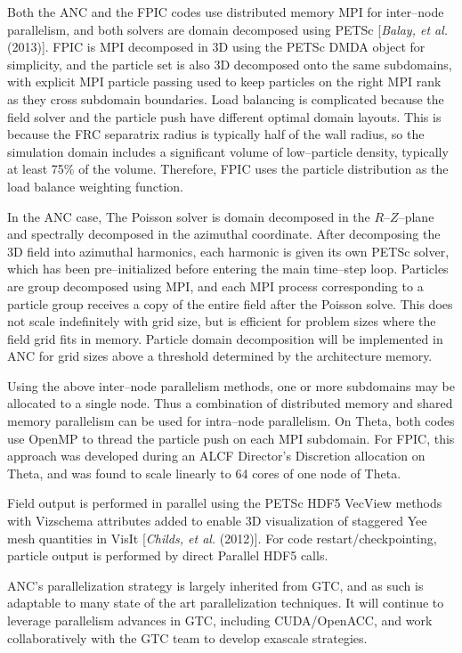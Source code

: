 \documentclass[a4paper,openany,12pt]{book}
\begin{document}
Both the ANC and the FPIC codes use distributed memory MPI for inter--node parallelism, and both solvers are domain decomposed using PETSc [\emph{Balay, et al.} (2013)]. FPIC is MPI decomposed in 3D using the PETSc DMDA object for simplicity, and the particle set is also 3D decomposed onto the same subdomains, with explicit MPI particle passing used to keep particles on the right MPI rank as they cross subdomain boundaries. Load balancing is complicated because the field solver and the particle push have different optimal domain layouts. This is because the FRC separatrix radius is typically half of the wall radius, so the simulation domain includes a significant volume of low--particle density, typically at least 75\% of the volume. Therefore, FPIC uses the particle distribution as the load balance weighting function.

In the ANC case, The Poisson solver is domain decomposed in the 
$R$--$Z$--plane and spectrally decomposed in the azimuthal coordinate. After decomposing the 3D field into azimuthal harmonics, each harmonic is given its own PETSc solver, which has been pre--initialized before entering the main time--step loop. Particles are group decomposed using MPI, and each MPI process corresponding to a particle group receives a copy of the entire field after the Poisson solve. This does not scale indefinitely with grid size, but is efficient for problem sizes where the field grid fits in memory. Particle domain decomposition will be implemented in ANC for grid sizes above a threshold determined by the architecture memory.

Using the above inter--node parallelism methods, one or more subdomains may be allocated to a single node. Thus a combination of distributed memory and shared memory parallelism can be used for intra--node parallelism. On Theta, both codes use OpenMP to thread the particle push on each MPI subdomain. For FPIC, this approach was developed during an ALCF Director's Discretion allocation on Theta, and was found to scale linearly to 64 cores of one node of Theta. 

Field output is performed in parallel using the PETSc HDF5 VecView methods with Vizschema attributes added to enable 3D visualization of staggered Yee mesh quantities in VisIt [\emph{Childs, et al.} (2012)]. For code restart/checkpointing, particle output is performed by direct Parallel HDF5 calls.

ANC's parallelization strategy is largely inherited from GTC, and as such is adaptable to many state of the art parallelization techniques. It will continue to leverage parallelism advances in GTC, including CUDA/OpenACC, and work collaboratively with the GTC team to develop exascale strategies.
\end{document}
